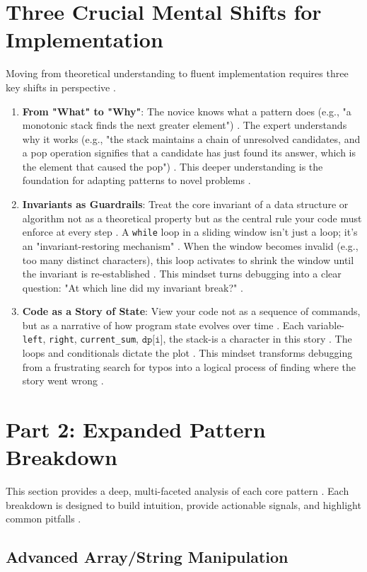 \documentclass{article}
\begin{document}
\section{Three Crucial Mental Shifts for Implementation}
Moving from theoretical understanding to fluent implementation requires three key shifts in perspective \cite{56}.
\begin{enumerate}
\item \textbf{From "What" to "Why"}: The novice knows what a pattern does (e.g., "a monotonic stack finds the next greater element") \cite{57}. The expert understands why it works (e.g., "the stack maintains a chain of unresolved candidates, and a pop operation signifies that a candidate has just found its answer, which is the element that caused the pop") \cite{58}. This deeper understanding is the foundation for adapting patterns to novel problems \cite{59}.
\item \textbf{Invariants as Guardrails}: Treat the core invariant of a data structure or algorithm not as a theoretical property but as the central rule your code must enforce at every step \cite{60}. A \texttt{while} loop in a sliding window isn't just a loop; it's an "invariant-restoring mechanism" \cite{61, 62}. When the window becomes invalid (e.g., too many distinct characters), this loop activates to shrink the window until the invariant is re-established \cite{62}. This mindset turns debugging into a clear question: "At which line did my invariant break?" \cite{63}.
\item \textbf{Code as a Story of State}: View your code not as a sequence of commands, but as a narrative of how program state evolves over time \cite{64}. Each variable-\texttt{left}, \texttt{right}, \texttt{current_sum}, \(\texttt{dp[i]}\), the stack-is a character in this story \cite{65}. The loops and conditionals dictate the plot \cite{65}. This mindset transforms debugging from a frustrating search for typos into a logical process of finding where the story went wrong \cite{66}.
\end{enumerate}

\section{Part 2: Expanded Pattern Breakdown}
This section provides a deep, multi-faceted analysis of each core pattern \cite{68}. Each breakdown is designed to build intuition, provide actionable signals, and highlight common pitfalls \cite{69}.

\subsection{Advanced Array/String Manipulation}
\end{document}
